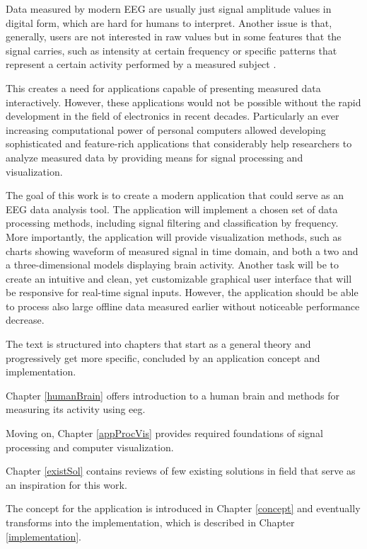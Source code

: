 Data measured by modern EEG are usually just signal amplitude values in digital form, which are hard for humans to interpret. Another issue is that, generally, users are not interested in raw values but in some features that the signal carries, such as intensity at certain frequency or specific patterns that represent a certain activity performed by a measured subject \cite{eegClass}. 

This creates a need for applications capable of presenting measured data interactively. However, these applications would not be possible without the rapid development in the field of electronics in recent decades. Particularly an ever increasing computational power of personal computers allowed developing sophisticated and feature-rich applications that considerably help researchers to analyze measured data by providing means for signal processing and visualization.

The goal of this work is to create a modern application that could serve as an EEG data analysis tool. The application will implement a chosen set of data processing methods, including signal filtering and classification by frequency. More importantly, the application will provide visualization methods, such as charts showing waveform of measured signal in time domain, and both a two and a three-dimensional models displaying brain activity. Another task will be to create an intuitive and clean, yet customizable graphical user interface that will be responsive for real-time signal inputs. However, the application should be able to process also large offline data measured earlier without noticeable performance decrease.

The text is structured into chapters that start as a general theory and
progressively get more specific, concluded by an application concept and
implementation. 

Chapter \ref{humanBrain} offers introduction to a human brain and methods for measuring its activity using \gls{eeg}.

Moving on, Chapter \ref{appProcVis} provides required foundations of signal processing and computer visualization. 

Chapter \ref{existSol} contains reviews of few existing solutions in field that serve as an inspiration for this work.

The concept for the application is introduced in Chapter \ref{concept} and eventually transforms into the implementation, which is described in Chapter \ref{implementation}.
 
